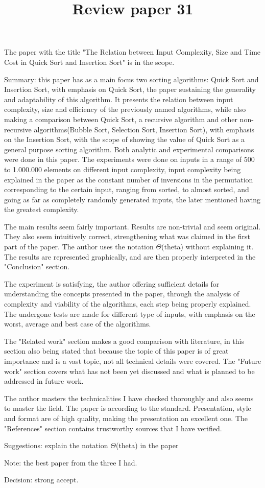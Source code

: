 \documentclass[]{article}
\title{Review paper 31}
\date{}
\begin{document}
	
	
\maketitle

The paper with the title "The Relation between Input Complexity, Size and Time Cost in Quick Sort and Insertion Sort" is in the scope.

Summary: this paper has as a main focus two sorting algorithms: Quick Sort and Insertion Sort, with emphasis on Quick Sort, the paper sustaining the generality and adaptability of this algorithm. It presents the relation between input complexity, size and efficiency of the previously named algorithms, while also making a comparison between Quick Sort, a recursive algorithm and other non-recursive algorithms(Bubble Sort, Selection Sort, Insertion Sort), with emphasis on the Insertion Sort, with the scope of showing the value of Quick Sort as a general purpose sorting algorithm. Both analytic and experimental comparisons were done in this paper. The experiments were done on inputs in a range of 500 to 1.000.000 elements on different input complexity, input complexity being explained in the paper as the constant number of inversions in the permutation corresponding to the certain input, ranging from sorted, to almost sorted, and going as far as completely randomly generated inputs, the later mentioned having the greatest complexity.

The main results seem fairly important. Results are non-trivial and seem original. They also seem intuitively correct, strengthening what was claimed in the first part of the paper. The author uses the notation $\Theta$(theta) without explaining it. The results are represented graphically, and are then properly interpreted in the "Conclusion" section.

The experiment is satisfying, the author offering sufficient details for understanding the concepts presented in the paper, through the analysis of complexity and viability of the algorithms, each step being properly explained. The undergone tests are made for different type of inputs, with emphasis on the worst, average and best case of the algorithms.

The "Related work" section makes a good comparison with literature, in this section also being stated that because the topic of this paper is of great importance and is a vast topic, not all technical details were covered. The "Future work" section covers what has not been yet discussed and what is planned to be addressed in future work.

The author masters the technicalities I have checked thoroughly and also seems to master the field. The paper is according to the standard. Presentation, style and format are of high quality, making the presentation an excellent one. The "References" section contains trustworthy sources that I have verified.

Suggestions: explain the notation $\Theta$(theta) in the paper

Note: the best paper from the three I had.

Decision: strong accept.
\end{document}
